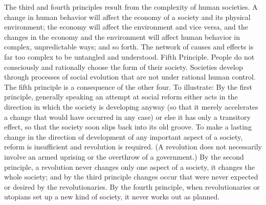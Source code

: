 { The third and fourth principles result from the complexity of human societies. A change in human behavior will affect the economy of a society and its physical environment; the economy will affect the environment and vice versa, and the changes in the economy and the environment will affect human behavior in complex, unpredictable ways; and so forth. The network of causes and effects is far too complex to be untangled and understood.
 {\sc Fifth Principle.} People do not consciously and rationally choose the form of their society. Societies develop through processes of social evolution that are not under rational human control.
 The fifth principle is a consequence of the other four.
 To illustrate: By the first principle, generally speaking an attempt at social reform either acts in the direction in which the society is developing anyway (so that it merely accelerates a change that would have occurred in any case) or else it has only a transitory effect, so that the society soon slips back into its old groove. To make a lasting change in the direction of development of any important aspect of a society, reform is insufficient and revolution is required. (A revolution does not necessarily involve an armed uprising or the overthrow of a government.) By the second principle, a revolution never changes only one aspect of a society, it changes the whole society; and by the third principle changes occur that were never expected or desired by the revolutionaries. By the fourth principle, when revolutionaries or utopians set up a new kind of society, it never works out as planned.
}
